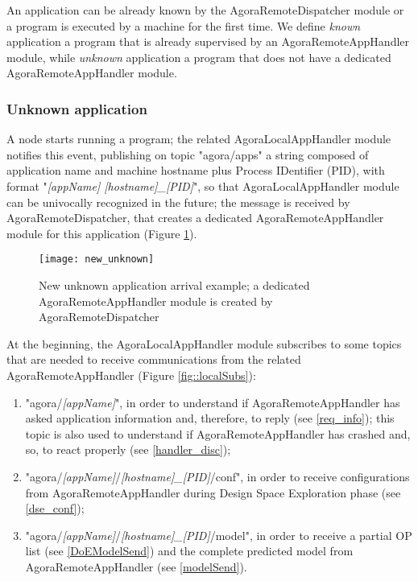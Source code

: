 An application can be already known by the Agora\-Remote\-Dis\-patch\-er module or a program is executed by a machine for the first time. We define \textit{known} application a program that is already supervised by an AgoraRemoteAppHandler module, while \textit{unknown} application a program that does not have a dedicated AgoraRemoteAppHandler module.

\subsubsection{Unknown application}

A node starts running a program; the related AgoraLocalAppHandler module notifies this event, publishing on topic "agora\slash{}apps" a string composed of application name and machine hostname plus Process IDentifier (PID), with format "\textit{[appName] [hostname]\_[PID]}", so that AgoraLocalAppHandler module can be univocally recognized in the future; the message is received by Agora\-Remote\-Dispatcher, that creates a dedicated AgoraRemoteAppHandler module for this application (Figure \ref{fig::unk}).

\begin{figure}[hb]

    \centering
    \texttt{[image: new\_unknown]}
    \caption[New unknown application arrival example]{New unknown application arrival example; a dedicated AgoraRemoteAppHandler module is created by AgoraRemoteDispatcher}

    \label{fig::unk}
    
\end{figure}

At the beginning, the Agora\-Local\-App\-Handler module subscribes to some topics that are needed to receive communications from the related Agora\-Remote\-App\-Handler (Figure \ref{fig::localSubs}):

\begin{enumerate}

    \item "agora/\textit{[appName]}", in order to understand if AgoraRemoteAppHandler has asked application information and, therefore, to reply (see \ref{req_info}); this topic is also used to understand if Agora\-Remote\-App\-Handler has crashed and, so, to react properly (see \ref{handler_disc});
    
    \item "agora/\textit{[appName]}/\textit{[hostname]\_[PID]}/conf", in order to receive configurations from AgoraRemoteAppHandler during Design Space Exploration phase (see \ref{dse_conf});
    
    \item "agora/\textit{[appName]}/\textit{[hostname]\_[PID]}/model", in order to receive a partial OP list (see \ref{DoEModelSend}) and the complete predicted model from AgoraRemoteAppHandler (see \ref{modelSend}).

\end{enumerate}

